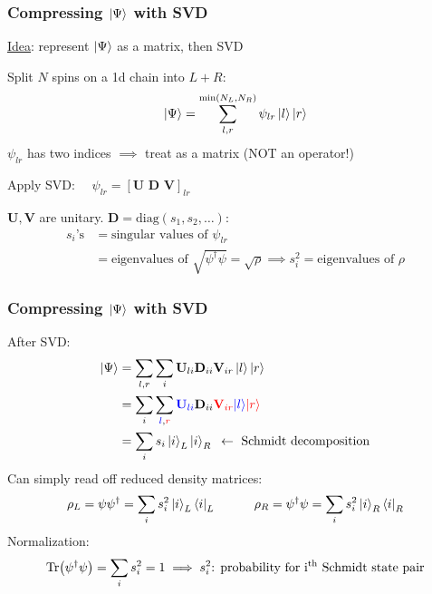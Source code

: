 \documentclass{beamer}
\theoremstyle{definition}
\begin{document}
\begin{frame}
	\frametitle{Compressing $\ket{\Psi}$ with SVD}
	\underline{Idea}: represent $\ket{\Psi}$ as a matrix, then SVD\\
	
	\pause
	
	\vspace{8pt}
	
	Split $N$ spins on a 1d chain into $L+R$: 
	\begin{align*}
		\ket{\Psi} = \sum_{l,r}^{\min(N_L,N_R)} \psi_{lr} \ket{l}\ket{r}
	\end{align*}
	$\psi_{lr}$ has two indices $\implies$ treat as a matrix (NOT an operator!) \\ 
	
	\pause
	
	\vspace{8pt} 
	
	Apply SVD: $\quad\psi_{lr} = [\mathbf{U}\,\,\mathbf{D}\,\,\mathbf{V}]_{lr}$\\
	
	\vspace{8pt}
	
	$\mathbf{U}, \mathbf{V}$ are unitary. $\mathbf{D} = \text{diag}(s_1,s_2,\dots)$:
	\begin{align*}
		s_i\text{'s} 
		&= \text{singular values of } \psi_{lr} \\
		&= \text{eigenvalues of } \sqrt{\psi^\dagger\psi} = \sqrt{\rho} \implies s_i^2 = \text{eigenvalues of } \rho
	\end{align*}
	
\end{frame}


\begin{frame}
	\frametitle{Compressing $\ket{\Psi}$ with SVD}
	
	After SVD:
	\begin{align*}
		\ket{\Psi} &= \sum_{l,r} \sum_{i} \mathbf{U}_{li}\mathbf{D}_{ii} \mathbf{V}_{ir} \ket{l}\ket{r}\\
		&= \sum_{i} \sum_{\textcolor{blue}{l},\textcolor{red}{r}}  \textcolor{blue}{\mathbf{U}_{li}}\mathbf{D}_{ii} \textcolor{red}{\mathbf{V}_{ir} } \textcolor{blue}{\ket{l}}\textcolor{red}{\ket{r}}\\
		&= \sum_i s_i \ket{i}_L \ket{i}_R \,\,\,\leftarrow \text{ Schmidt decomposition}
	\end{align*}
\pause 
	Can simply read off reduced density matrices:
	\begin{align*}
		\rho_L = \psi\psi^\dagger = \sum_i s_i^2 \ket{i}_L \bra{i}_L \quad\quad\quad \rho_R = \psi^\dagger\psi = \sum_i s_i^2 \ket{i}_R \bra{i}_R
	\end{align*}
\pause
	Normalization:
	\begin{align*}
		\Tr(\psi^\dagger\psi) = \sum_i s_i^2 = 1 \implies s_i^2 \text{: probability for i$^\text{th}$ Schmidt state pair}
	\end{align*}
\end{frame}
\end{document}
